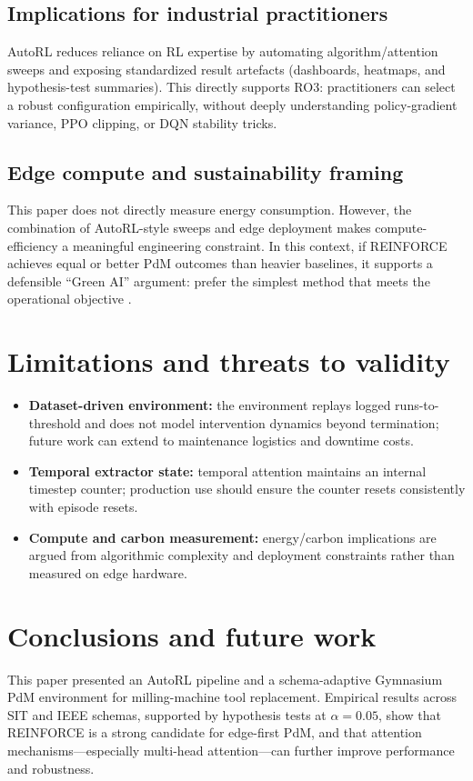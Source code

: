 \documentclass[11pt]{article}
\begin{document}
\subsection{Implications for industrial practitioners}
AutoRL reduces reliance on RL expertise by automating algorithm/attention sweeps and exposing standardized result artefacts (dashboards, heatmaps, and hypothesis-test summaries). This directly supports RO3: practitioners can select a robust configuration empirically, without deeply understanding policy-gradient variance, PPO clipping, or DQN stability tricks.

\subsection{Edge compute and sustainability framing}
This paper does not directly measure energy consumption. However, the combination of AutoRL-style sweeps and edge deployment makes compute-efficiency a meaningful engineering constraint. In this context, if REINFORCE achieves equal or better PdM outcomes than heavier baselines, it supports a defensible ``Green AI'' argument: prefer the simplest method that meets the operational objective \parencite{Schwartz2020GreenAI, Strubell2019Energy}.

\section{Limitations and threats to validity}
\label{sec:limits}
\begin{itemize}
	\item \textbf{Dataset-driven environment:} the environment replays logged runs-to-threshold and does not model intervention dynamics beyond termination; future work can extend to maintenance logistics and downtime costs.
	\item \textbf{Temporal extractor state:} temporal attention maintains an internal timestep counter; production use should ensure the counter resets consistently with episode resets.
	\item \textbf{Compute and carbon measurement:} energy/carbon implications are argued from algorithmic complexity and deployment constraints rather than measured on edge hardware.
\end{itemize}

\section{Conclusions and future work}
\label{sec:conclusion}
This paper presented an AutoRL pipeline and a schema-adaptive Gymnasium PdM environment for milling-machine tool replacement. Empirical results across SIT and IEEE schemas, supported by hypothesis tests at $\alpha=0.05$, show that REINFORCE is a strong candidate for edge-first PdM, and that attention mechanisms---especially multi-head attention---can further improve performance and robustness.
\end{document}
